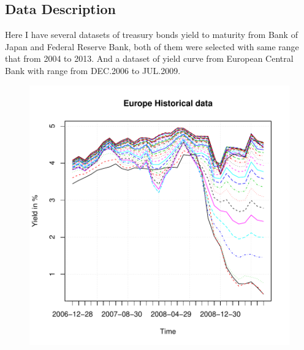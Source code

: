 \documentclass{article}
\begin{document}
\begin{spacing}{1.5}
\section{Data Description}
 Here I have several datasets of treasury bonds yield to maturity from Bank of Japan and Federal Reserve Bank, both of them were selected with same range that from 2004 to 2013. And a dataset of yield curve from European Central Bank with range from DEC.2006 to JUL.2009.








\begin{center}
\begin{figure}[htbp]
\includegraphics{Graduation_Paper-007}
\end{figure}
\end{center}


\end{spacing}
\end{document}
